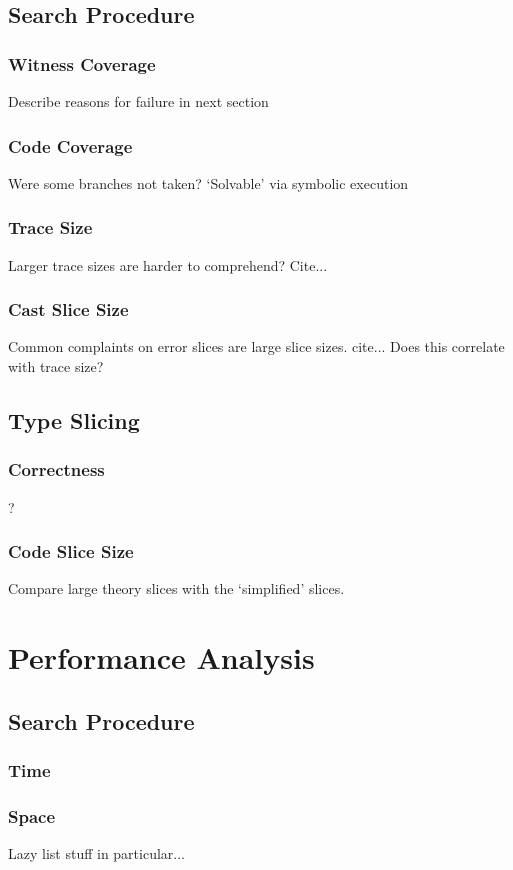 \subsection{Search Procedure}
\subsubsection{Witness Coverage}
Describe reasons for failure in next section
\subsubsection{Code Coverage}
Were some branches not taken? `Solvable' via symbolic execution
\subsubsection{Trace Size}
Larger trace sizes are harder to comprehend? Cite...
\subsubsection{Cast Slice Size}
Common complaints on error slices are large slice sizes. cite... 
Does this correlate with trace size?

\subsection{Type Slicing}
\subsubsection{Correctness}
?
\subsubsection{Code Slice Size}
Compare large theory slices with the `simplified' slices.


\section{Performance Analysis}\label{sec:PerformanceAnalysis}
\subsection{Search Procedure}
\subsubsection{Time}
\subsubsection{Space}
Lazy list stuff in particular...

